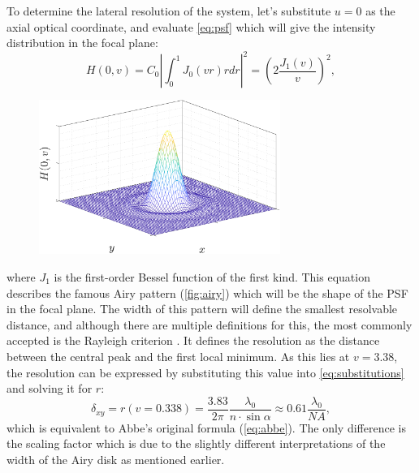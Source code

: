     To determine the lateral resolution of the system, let's substitute $u=0$ as the axial optical coordinate, and evaluate \autoref{eq:psf} which will give the intensity distribution in the focal plane:
    \begin{equation}
      H(0,v) = C_0 \left| \int_0^1 J_0(vr)rdr \right|^2 = \left(2\frac{J_1(v)}{v} \right) ^2,
      \label{eq:airy}
    \end{equation}
    \begin{figure}
      \centering
      \includegraphics[width=0.7\textwidth]{airy}
      \label{fig:airy}
    \end{figure}


    

    where $J_1$ is the first-order Bessel function of the first kind.
    This equation describes the famous Airy pattern (\autoref{fig:airy}) which will be the shape of the PSF in the focal plane. The width of this pattern will define the smallest resolvable distance, and although there are multiple definitions for this, the most commonly accepted is the Rayleigh criterion \cite{f.r.s_xxxi._1879, born_principles_2013}. It defines the resolution as the distance between the central peak and the first local minimum. As this lies at $v=3.38$, the resolution can be expressed by substituting this value into \autoref{eq:substitutions} and solving it for $r$:
    \begin{equation}
      \delta_{xy} = r(v=0.338) = \frac{3.83}{2\pi} \frac{\lambda_0}{n\cdot \sin \alpha} \approx 0.61 \frac{\lambda_0}{NA},
      \label{eq:lateralRes}
    \end{equation}
    which is equivalent to Abbe's original formula (\autoref{eq:abbe}). The only difference is the scaling factor which is due to the slightly different interpretations of the width of the Airy disk as mentioned earlier.


